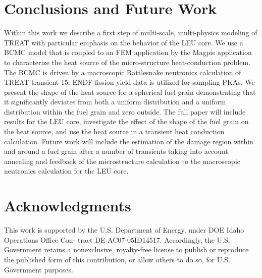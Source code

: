 \documentclass{anstrans}
\begin{document}
\section{Conclusions and Future Work}
Within this work we describe a first step of multi-scale, multi-physics modeling of TREAT with particular emphasis on the behavior of the LEU core. We use a BCMC model that is coupled to an FEM application by the Magpie application to characterize the heat source of the micro-structure heat-conduction problem. The BCMC is driven by a macroscopic Rattlesnake \cite{Rattlesnake} neutronics calculation of TREAT transient 15. ENDF fission yield data is utilized for sampling PKAs. We present the shape of the heat source for a spherical fuel grain demonstrating that it significantly deviates from both a uniform distribution and a uniform distribution within the fuel grain and zero outside.
The full paper will include results for the LEU core, investigate the effect of the shape of the fuel grain on the heat source, and use the heat source in a transient heat conduction calculation. Future work will include the estimation of the damage region within and around a fuel grain after a number of transients taking into account annealing and feedback of the microstructure calculation to the macroscopic neutronics calculation for the LEU core. 

\section{Acknowledgments}
This work is supported by the U.S. Department of Energy, under DOE Idaho Operations Office Con- tract DE-AC07-05ID14517. Accordingly, the U.S. Government retains a nonexclusive, royalty-free license to publish or reproduce the published form of this contribution, or allow others to do so, for U.S. Government purposes.
\end{document}
